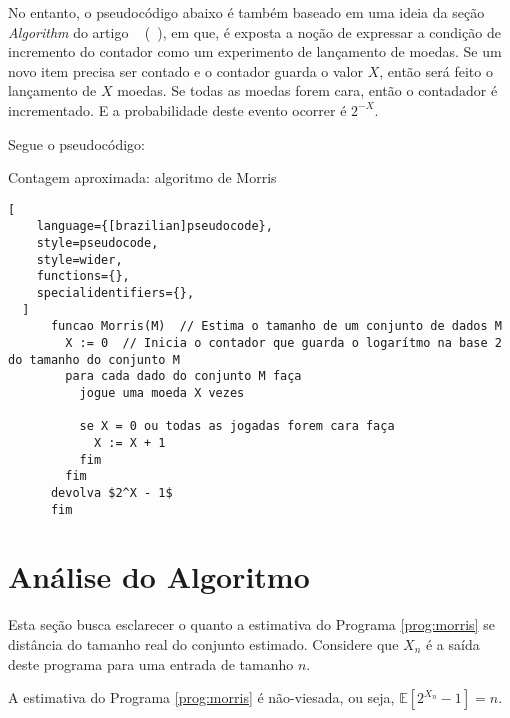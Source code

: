 No entanto, o pseudocódigo abaixo é também baseado em uma ideia da seção \textit{Algorithm} do artigo ~ (~\cite{ApproximateCountingAlgorithm}), 
em que, é exposta a noção de expressar a condição de incremento do contador como um experimento de lançamento de moedas. 
Se um novo item precisa ser contado e o contador guarda o valor $X$, então será feito o lançamento de $X$ moedas. Se todas as moedas forem cara, então o contadador é incrementado.
E a probabilidade deste evento ocorrer é $2^{-X}$. 

Segue o pseudocódigo:
\begin{programruledcaption}{Contagem aproximada: algoritmo de Morris\label{prog:morris}}
  \begin{lstlisting}[
    language={[brazilian]pseudocode},
    style=pseudocode,
    style=wider,
    functions={},
    specialidentifiers={},
  ]
      funcao Morris(M)  // Estima o tamanho de um conjunto de dados M
        X := 0  // Inicia o contador que guarda o logarítmo na base 2 do tamanho do conjunto M
        para cada dado do conjunto M faça
          jogue uma moeda X vezes

          se X = 0 ou todas as jogadas forem cara faça
            X := X + 1
          fim
        fim
      devolva $2^X - 1$
      fim
  \end{lstlisting}
\end{programruledcaption}

\section{Análise do Algoritmo}

Esta seção busca esclarecer o quanto a estimativa do Programa \ref{prog:morris} se distância do tamanho real do conjunto estimado.
Considere que $X_n$ é a saída deste programa para uma entrada de tamanho $n$.

\begin{lemma}
A estimativa do Programa \ref{prog:morris} é não-viesada, ou seja, $\mathbb{E}[2^{X_n} - 1] = n$.
\end{lemma}

